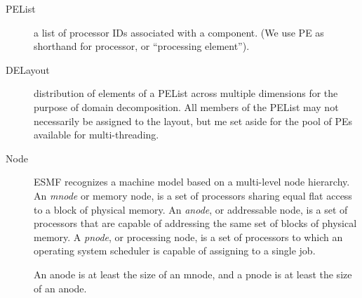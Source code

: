 
\begin{description}
\item[PEList] a list of processor IDs associated with a component. (We
  use PE as shorthand for processor, or ``processing element'').
\item[DELayout] distribution of elements of a PEList across multiple
  dimensions for the purpose of domain decomposition. All members of
  the PEList may not necessarily be assigned to the layout, but me
  set aside for the pool of PEs available for multi-threading.
\item[Node] ESMF recognizes a machine model based on a multi-level node
  hierarchy. An \emph{mnode} or memory node, is a set of processors
  sharing equal flat access to a block of physical memory. An
  \emph{anode}, or addressable node, is a set of processors that are
  capable of addressing the same set of blocks of physical memory. A
  \emph{pnode}, or processing node, is a set of processors to which an
  operating system scheduler is capable of assigning to a single job.

  An anode is at least the size of an mnode, and a pnode is at least
  the size of an anode.
  

\end{description}
